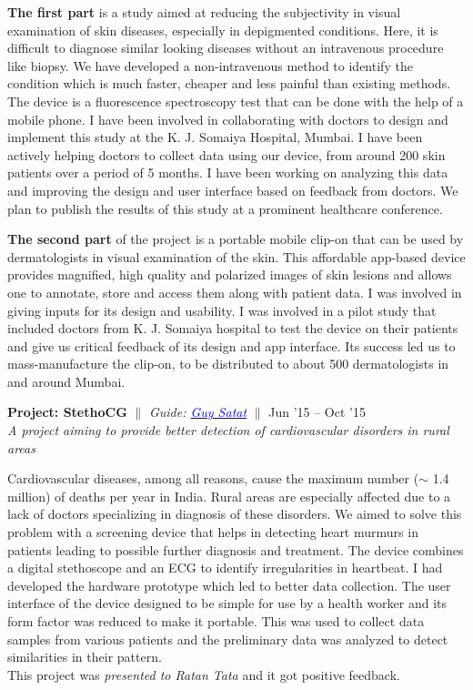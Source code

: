 \documentclass[margin,line]{res}
\newenvironment{list1}{
  \begin{list}{\ding{113}}{%
      \setlength{\itemsep}{0in}
      \setlength{\parsep}{0in} \setlength{\parskip}{0in}
      \setlength{\topsep}{0in} \setlength{\partopsep}{0in} 
      \setlength{\leftmargin}{0.17in}}}{\end{list}}
\begin{document}
\begin{resume}
\begin{list1}
\noindent \textbf{The first part} is a study aimed at reducing the subjectivity in visual examination of skin diseases, especially in depigmented conditions. Here, it is difficult to diagnose similar looking diseases without an intravenous procedure like biopsy. We have developed a non-intravenous method to identify the condition which is much faster, cheaper and less painful than existing methods. The device is a fluorescence spectroscopy test that can be done with the help of a mobile phone. I have been involved in collaborating with doctors to design and implement this study at the K. J. Somaiya Hospital, Mumbai. I have been actively helping doctors to collect data using our device, from around 200 skin patients over a period of 5 months. I have been working on analyzing this data and improving the design and user interface based on feedback from doctors. We plan to publish the results of this study at a prominent healthcare conference.
\vspace{4pt}

\noindent \textbf{The second part} of the project is a portable mobile clip-on that can be used by dermatologists in visual examination of the skin. This affordable app-based device provides magnified, high quality and polarized images of skin lesions and allows one to annotate, store and access them along with patient data. I was involved in giving inputs for its design and usability. I was involved in a pilot study that included doctors from K. J. Somaiya hospital to test the device on their patients and give us critical feedback of its design and app interface. Its success led us to mass-manufacture the clip-on, to be distributed to about 500 dermatologists in and around Mumbai. \\
\vspace*{-.05in}

\item[]\textbf{Project: StethoCG} \hfill $\|$ \hfill {\em Guide: \href{http://web.media.mit.edu/~guysatat/}{\textcolor{blue} {Guy Satat}}} \hfill $\|$ \hfill {Jun '15 -- Oct '15} \\
\textit{A project aiming to provide better detection of cardiovascular disorders in rural areas}
\vspace{4pt}

\noindent Cardiovascular diseases, among all reasons, cause the maximum number ($\sim$ 1.4 million) of deaths per year in India. Rural areas are especially affected due to a lack of doctors specializing in diagnosis of these disorders. We aimed to solve this problem with a screening device that helps in detecting heart murmurs in patients leading to possible further diagnosis and treatment. The device combines a digital stethoscope and an ECG to identify irregularities in heartbeat. I had developed the hardware prototype which led to better data collection. The user interface of the device designed to be simple for use by a health worker and its form factor was reduced to make it portable. This was used to collect data samples from various patients and the preliminary data was analyzed to detect similarities in their pattern.\\ 
This project was \textit{presented to Ratan Tata} and it got positive feedback.


\end{list1}
\end{resume}
\end{document}
